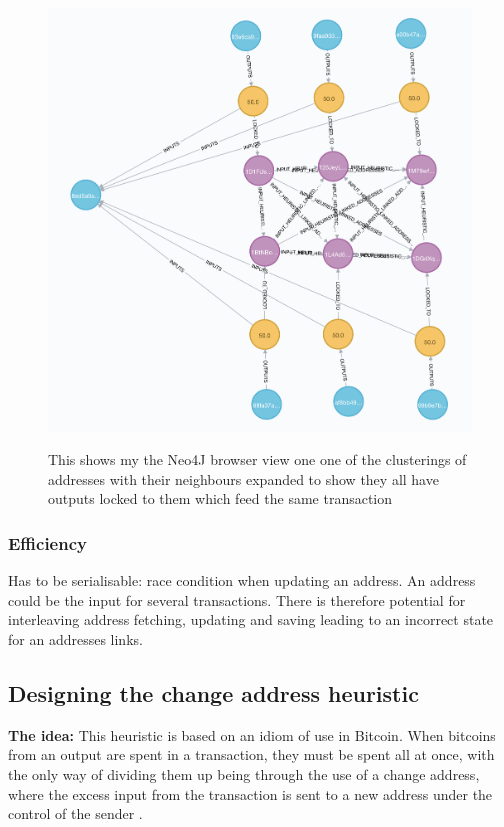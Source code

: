 \begin{itemize}
\begin{figure}[h!]
  \centering
  \includegraphics[width = 15cm]{./figures/input-one-tx-heuristic-1}\\[0.5cm] 
  \caption{This shows my the Neo4J browser view one one of the clusterings of addresses with their neighbours expanded to show they all have outputs locked to them which feed the same transaction}
  \label{fig:neo4j-1-tx-heuristic-1-cluster}
\end{figure}


\subsubsection{Efficiency}
Has to be serialisable: race condition when updating an address. An address could be the input for several transactions. There is therefore potential for interleaving address fetching, updating and saving leading to an incorrect state for an addresses links.  

\subsection{Designing the change address heuristic}
\textbf{The idea:} This heuristic is based on an idiom of use in Bitcoin. When bitcoins from an output are spent in a transaction, they must be spent all at once, with the only way of dividing them up being through the use of a change address, where the excess input from the transaction is sent to a new address under the control of the sender .


\end{itemize}
